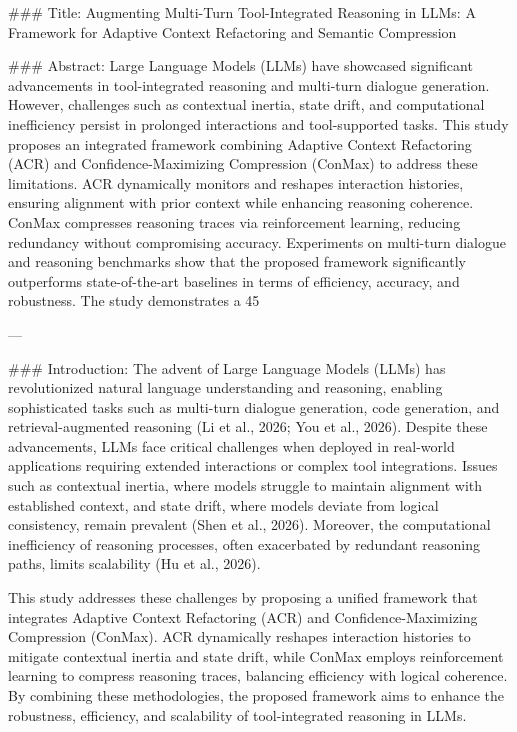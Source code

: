### Title:
Augmenting Multi-Turn Tool-Integrated Reasoning in LLMs: A Framework for Adaptive Context Refactoring and Semantic Compression

### Abstract:
Large Language Models (LLMs) have showcased significant advancements in tool-integrated reasoning and multi-turn dialogue generation. However, challenges such as contextual inertia, state drift, and computational inefficiency persist in prolonged interactions and tool-supported tasks. This study proposes an integrated framework combining Adaptive Context Refactoring (ACR) and Confidence-Maximizing Compression (ConMax) to address these limitations. ACR dynamically monitors and reshapes interaction histories, ensuring alignment with prior context while enhancing reasoning coherence. ConMax compresses reasoning traces via reinforcement learning, reducing redundancy without compromising accuracy. Experiments on multi-turn dialogue and reasoning benchmarks show that the proposed framework significantly outperforms state-of-the-art baselines in terms of efficiency, accuracy, and robustness. The study demonstrates a 45%

---

### Introduction:
The advent of Large Language Models (LLMs) has revolutionized natural language understanding and reasoning, enabling sophisticated tasks such as multi-turn dialogue generation, code generation, and retrieval-augmented reasoning (Li et al., 2026; You et al., 2026). Despite these advancements, LLMs face critical challenges when deployed in real-world applications requiring extended interactions or complex tool integrations. Issues such as contextual inertia, where models struggle to maintain alignment with established context, and state drift, where models deviate from logical consistency, remain prevalent (Shen et al., 2026). Moreover, the computational inefficiency of reasoning processes, often exacerbated by redundant reasoning paths, limits scalability (Hu et al., 2026).

This study addresses these challenges by proposing a unified framework that integrates Adaptive Context Refactoring (ACR) and Confidence-Maximizing Compression (ConMax). ACR dynamically reshapes interaction histories to mitigate contextual inertia and state drift, while ConMax employs reinforcement learning to compress reasoning traces, balancing efficiency with logical coherence. By combining these methodologies, the proposed framework aims to enhance the robustness, efficiency, and scalability of tool-integrated reasoning in LLMs.

